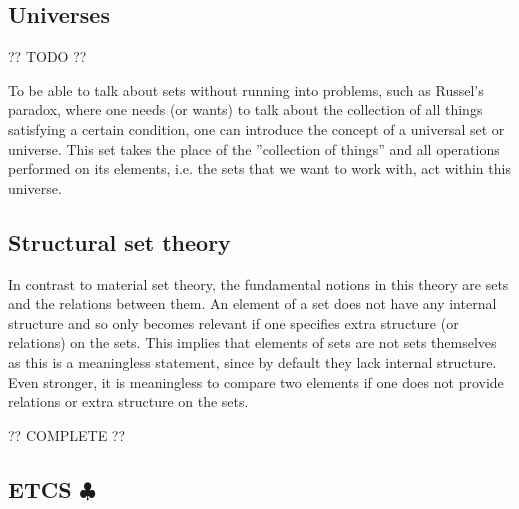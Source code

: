 \subsection{Universes}\label{section:universes}

    ?? TODO ??

    To be able to talk about sets without running into problems, such as Russel's paradox, where one needs (or wants) to talk about the collection of all things satisfying a certain condition, one can introduce the concept of a universal set or universe. This set takes the place of the ''collection of things'' and all operations performed on its elements, i.e. the sets that we want to work with, act within this universe.


\subsection{Structural set theory}

    In contrast to material set theory, the fundamental notions in this theory are sets and the relations between them. An element of a set does not have any internal structure and so only becomes relevant if one specifies extra structure (or relations) on the sets. This implies that elements of sets are not sets themselves as this is a meaningless statement, since by default they lack internal structure. Even stronger, it is meaningless to compare two elements if one does not provide relations or extra structure on the sets.

    ?? COMPLETE ??

\subsection{\texorpdfstring{ETCS $\clubsuit$}{ETCS}}

